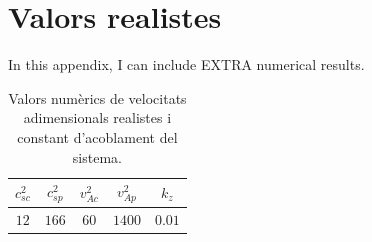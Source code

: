 \newpage
\renewcommand{\theequation}{\Alph{section}\arabic{equation}}
\setcounter{equation}{1}
\appendix

\chapter{Valors realistes} \label{ap.B}
In this appendix, I can include EXTRA numerical results.

\begin{table}[H]
	\centering
	\begin{tabular}{|c|c|c|c|c|}
		\hline
		$c_{s c}^2$ & $c_{s p}^2$ & $v_{A c}^2$ & $v_{A p}^2$ & $k_z$ \\
		\hline
		$12$ & $166$ & $60$ & $1400$ & $0.01$ \\
		\hline
	\end{tabular}
	\caption{Valors numèrics de velocitats adimensionals realistes i constant d'acoblament del sistema.}
	\label{tab:valors_apendix}
\end{table}
\vspace{-10pt}

